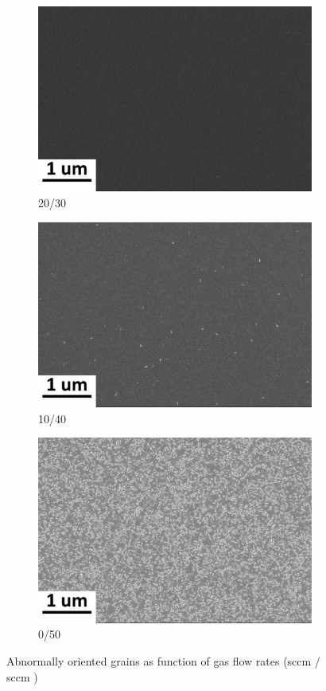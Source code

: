 \begin{figure}[ht]
	\begin{subfigure}{.33\textwidth}
		\centering
		\includegraphics[width=.9\linewidth]{images/SEM/88344_middle_01}
		\caption{20/30}
	\end{subfigure}
	\begin{subfigure}{.33\textwidth}
		\centering
		\includegraphics[width=.9\linewidth]{images/SEM/88384_middle_01}
		\caption{10/40}
	\end{subfigure}
\begin{subfigure}{.33\textwidth}
	\centering
	\includegraphics[width=.9\linewidth]{images/SEM/88387_middle_01}
	\caption{0/50}
\end{subfigure}
\caption{Abnormally oriented grains as function of gas flow rates (sccm  / sccm  )}
\label{fig:AOG}
\end{figure}
	
